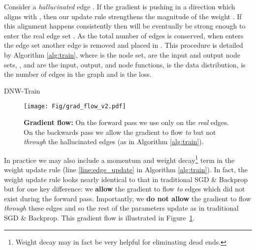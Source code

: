 \documentclass{article}
\begin{document}
Consider a \textit{hallucinated} edge . If the gradient is pushing  in a direction which aligns with , then our update rule strengthens the magnitude of the weight . If this alignment happens consistently then  will be eventually be strong enough to enter the real edge set . As the total number of edges is conserved, when  enters the edge set  another edge is removed and placed in . This procedure is detailed by Algorithm \ref{alg:train}, where  is the node set,  are the input and output node sets, ,  and  are the input, output, and node functions,  is the data distribution,  is the number of edges in the graph and  is the loss.
\begin{algorithm}[t]
\caption{DNW-Train}\label{alg:train}
\begin{algorithmic}[1]
  {\color{gray}}
\EndFor
{}
     {\color{gray}}
     {\color{gray}}
    \State{} {\color{gray}}
    \State{} {\color{gray}}
      {\color{gray}}
        \State{} {\color{gray}} \label{line:edge_update}
    \EndFor
\EndFor
\end{algorithmic}
\end{algorithm}
\begin{figure}[t]
    \centering
        \texttt{[image: Fig/grad\_flow\_v2.pdf]}
        \caption{\textbf{Gradient flow:} On the forward pass we use only on the \textit{real} edges. On the backwards pass we allow the gradient to flow \textit{to} but not \textit{through} the hallucinated edges (as in Algorithm \ref{alg:train}).}
        \label{fig:gradientflow}
\end{figure}

In practice we may also include a momentum and weight decay\footnote{Weight decay \cite{wd} may in fact be very helpful for eliminating dead ends.} term in the weight update rule (line \ref{line:edge_update} in Algorithm \ref{alg:train}). In fact, the weight update rule looks nearly identical to that in traditional SGD \& Backprop but for one key difference: we \textbf{allow} the gradient to flow \textit{to} edges which did not exist during the forward pass. Importantly, we \textbf{do not allow} the gradient to flow \textit{through} these edges and so the rest of the parameters update as in traditional SGD \& Backprop. This gradient flow is illustrated in Figure~\ref{fig:gradientflow}.
\end{document}
